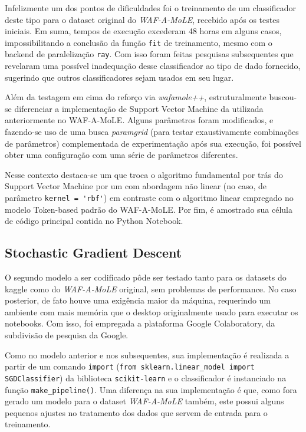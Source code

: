 Infelizmente um dos pontos de dificuldades foi o treinamento de um classificador deste tipo para o dataset original do \textit{WAF-A-MoLE}, recebido após os testes iniciais. Em suma, tempos de execução excederam 48 horas em alguns casos, impossibilitando a conclusão da função \verb+fit+ de treinamento, mesmo com o backend de paralelização \verb+ray+.  Com isso foram feitas pesquisas subsequentes que revelaram uma possível inadequação desse classificador ao tipo de dado fornecido, sugerindo que outros classificadores sejam usados em seu lugar.

Além da testagem em cima do reforço via \textit{wafamole++}, estruturalmente buscou-se diferenciar a implementação de Support Vector Machine da utilizada anteriormente no WAF-A-MoLE. Alguns parâmetros foram modificados, e fazendo-se uso de uma busca \textit{paramgrid} (para testar exaustivamente combinações de parâmetros) complementada de experimentação após sua execução, foi possível obter uma configuração com uma série de parâmetros diferentes.

Nesse contexto destaca-se um que troca o algoritmo fundamental por trás do Support Vector Machine por um com abordagem não linear (no caso, de parâmetro \verb+kernel = 'rbf'+) em contraste com o algoritmo linear empregado no modelo Token-based padrão do WAF-A-MoLE. Por fim, é amostrado sua célula de código principal contida no Python Notebook.

\label{sec:codigos:modelos}
\bigskip

\subsection{Stochastic Gradient Descent}
O segundo modelo a ser codificado pôde ser testado tanto para os datasets do kaggle como do \textit{WAF-A-MoLE} original, sem problemas de performance. No caso posterior, de fato houve uma exigência maior da máquina, requerindo um ambiente com mais memória que o desktop originalmente usado para executar os notebooks. Com isso, foi empregada a plataforma Google Colaboratory, da subdivisão de pesquisa da Google. 

Como no modelo anterior e nos subsequentes, sua implementação é realizada a partir de um comando \verb+import+ (\verb+from sklearn.linear_model import SGDClassifier+) da biblioteca \verb+scikit-learn+ e o classificador é instanciado na função \verb+make_pipeline()+. Uma diferença na sua implementação é que, como fora gerado um modelo para o dataset \textit{WAF-A-MoLE} também, este possui alguns pequenos ajustes no tratamento dos dados que servem de entrada para o treinamento.

